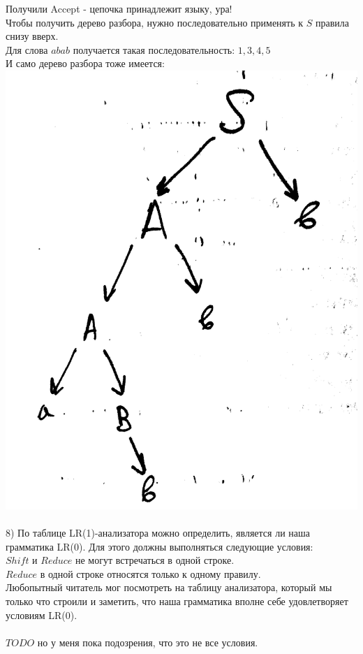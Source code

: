 \documentclass[14pt]{extreport}
\begin{document}
	Получили Accept - цепочка принадлежит языку, ура!\\
	\newpage
	Чтобы получить дерево разбора, нужно последовательно применять к $S$ правила снизу вверх.\\
	Для слова $abab$ получается такая последовательность: $1, 3, 4, 5$\\
	И само дерево разбора тоже имеется:\\
	\includegraphics[scale=0.1]{data/pic8_2.png}\\\\
	
	8) По таблице LR(1)-анализатора можно определить, является ли наша грамматика LR(0). Для
	этого должны выполняться следующие условия:\\
	\hspace*{30pt} $Shift$ и $Reduce$ не могут встречаться в одной строке.\\
	\hspace*{30pt} $Reduce$ в одной строке относятся только к одному правилу.\\
	Любопытный читатель мог посмотреть на таблицу анализатора, который мы только что строили
	и заметить, что наша грамматика вполне себе удовлетворяет условиям LR(0).\\\\
	$TODO$ но у меня пока подозрения, что это не все условия.
\end{document}
